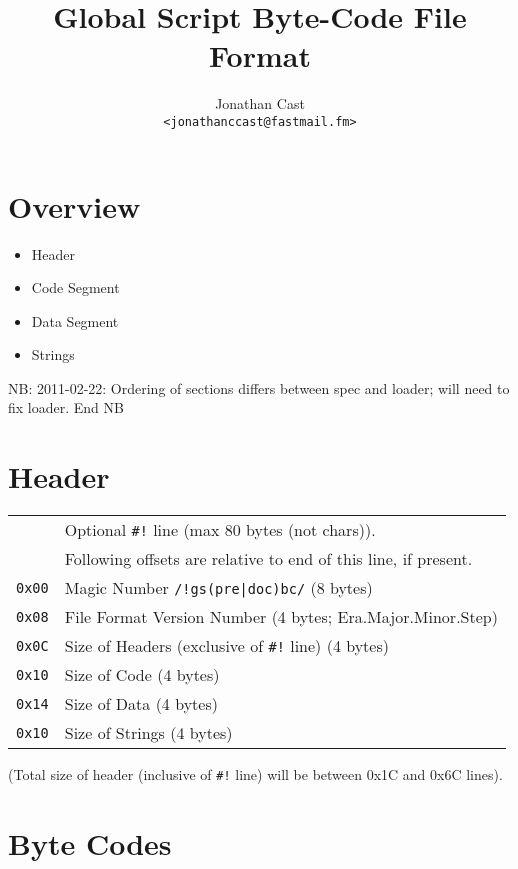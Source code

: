 \documentclass{article}
\title{Global Script Byte-Code File Format}
\author{Jonathan Cast\\\texttt{<jonathanccast@fastmail.fm>}}
\begin{document}
\maketitle

\section{Overview}

\begin{itemize}
  \item Header
  \item Code Segment
  \item Data Segment
  \item Strings
\end{itemize}
NB: 2011-02-22: Ordering of sections differs between spec and loader; will need to fix loader.  End NB

\section{Header}

\begin{tabular}{cl}
  & Optional \verb+#!+ line (max 80 bytes (not chars)). \\
  & Following offsets are relative to end of this line, if present.  \\
\texttt{0x00} & Magic Number \verb+/!gs(pre|doc)bc/+ (8 bytes) \\
\texttt{0x08} & File Format Version Number (4 bytes; Era.Major.Minor.Step) \\
\texttt{0x0C} & Size of Headers (exclusive of \verb+#!+ line) (4 bytes) \\
\texttt{0x10} & Size of Code (4 bytes) \\
\texttt{0x14} & Size of Data (4 bytes) \\
\texttt{0x10} & Size of Strings (4 bytes) \\
\end{tabular}

(Total size of header (inclusive of \verb+#!+ line) will be between 0x1C and 0x6C lines).

\section {Byte Codes}
\end{document}
